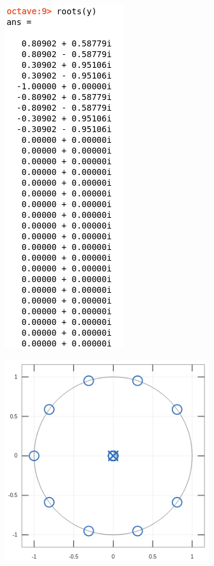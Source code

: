 \documentclass[11pt,a4paper]{article}
\begin{document}
\begin{figure}[H]
\begin{subfigure}{.5\textwidth}
  \centering
  \includegraphics[width=.3\linewidth]{img/polos4.png}
\end{subfigure}%
\begin{subfigure}{.5\textwidth}
  \centering
  \includegraphics[width=1\linewidth]{img/polosg4.png}
\end{subfigure}
\end{figure}
\end{document}
